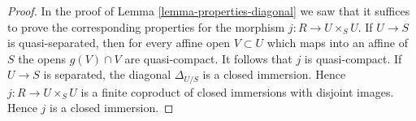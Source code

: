 \documentclass[10pt,a4paper]{amsart}
\theoremstyle{plain}
\theoremstyle{definition}
\theoremstyle{remark}
\numberwithin{equation}{subsection}
\begin{document}
\begin{proof}
In the proof of Lemma \ref{lemma-properties-diagonal}
we saw that it suffices to prove the
corresponding properties for the morphism $j : R \to U \times_S U$.
If $U \to S$ is quasi-separated, then for every affine open $V \subset U$
which maps into an affine of $S$
the opens $g(V) \cap V$ are quasi-compact. It follows that $j$ is
quasi-compact.
If $U \to S$ is separated, the diagonal $\Delta_{U/S}$ is a closed
immersion. Hence $j : R \to U \times_S U$ is a finite coproduct
of closed immersions with disjoint images. Hence $j$ is a closed immersion.
\end{proof}
\end{document}
